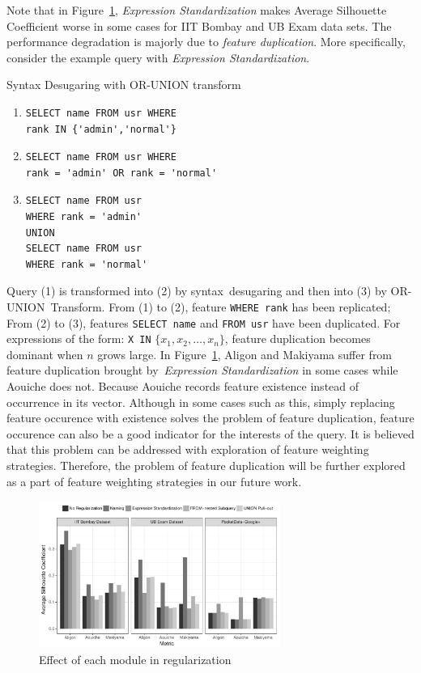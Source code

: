 Note that in Figure~\ref{fig:module}, \textit{Expression Standardization} makes Average Silhouette Coefficient worse in some cases for IIT Bombay and UB Exam data sets. 
The performance degradation is majorly due to \textit{feature duplication}. 
More specifically, consider the example query with \textit{Expression Standardization}.
\begin{example}
Syntax Desugaring with OR-UNION transform
{\footnotesize
\begin{enumerate}
\item\begin{verbatim}
SELECT name FROM usr WHERE 
rank IN {'admin','normal'}
\end{verbatim}
\item\begin{verbatim}
SELECT name FROM usr WHERE 
rank = 'admin' OR rank = 'normal'
\end{verbatim}
\item\begin{verbatim}
SELECT name FROM usr
WHERE rank = 'admin'
UNION
SELECT name FROM usr
WHERE rank = 'normal' 
\end{verbatim}
\end{enumerate}
}
\end{example}
Query (1) is transformed into (2) by syntax~desugaring and then into (3) by OR-UNION~Transform. From (1) to (2), feature \texttt{WHERE rank} has been replicated; From (2) to (3), features \texttt{SELECT name} and \texttt{FROM usr} have been duplicated. For expressions of the form: \texttt{X IN} $\{x_1,x_2,\dots,x_n\}$, feature duplication becomes dominant when $n$ grows large. 
In Figure~\ref{fig:module}, Aligon and Makiyama suffer from feature duplication brought by~\textit{Expression Standardization} in some cases while Aouiche does not. 
Because Aouiche records feature existence instead of occurrence in its vector. 
Although in some cases such as this, simply replacing feature occurence with existence solves the problem of feature duplication, feature occurence can also be a good indicator for the interests of the query. 
It is believed that this problem can be addressed with exploration of feature weighting strategies. 
Therefore, the problem of feature duplication will be further explored as a part of feature weighting strategies in our future work.

\begin{figure}[h!]
    \vspace*{-2mm}
    \centering
    \includegraphics[width=0.70\textwidth]{TKDE-QuerySimilarity/graphics/module}%
	\caption{Effect of each module in regularization}
    \label{fig:module}
\end{figure}

